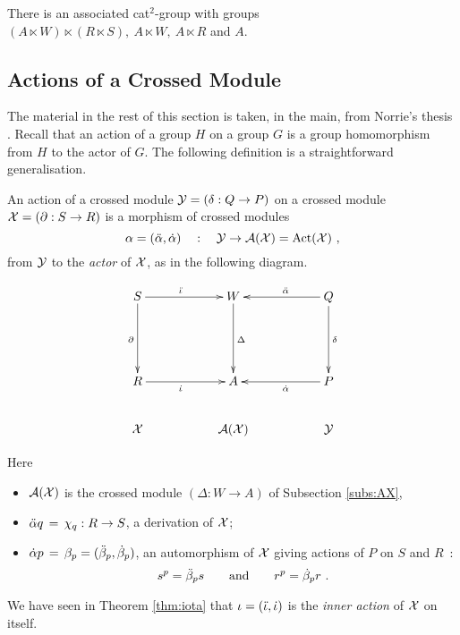 \noindent
There is an associated cat$^2$-group with groups 
$(A \ltimes W) \ltimes (R \ltimes S),~ A \ltimes W,~ A \ltimes R$ and $A$. 


\subsection{Actions of a Crossed Module}
\label{subs:xmod-action}

The material in the rest of this section is taken, in the main, 
from Norrie's thesis \cite{norrie-thesis}.
Recall that an action of a group $H$ on a group $G$
is a group homomorphism from $H$ to the actor of $G$.
The following definition is a straightforward generalisation.

\begin{defn} 
An action of a crossed module  $\mathcal{Y} = (\delta : Q \to P)$
on a crossed module  $\mathcal{X} = (\partial : S \to R)$ 
is a morphism of crossed modules
$$
\alpha = (\ddot{\alpha},\dot{\alpha}) \quad : \quad \mathcal{Y} \to \mathcal{A}(\mathcal{X}) = \mathrm{Act}(\mathcal{X})~,
$$
from $\mathcal{Y}$ to the \emph{actor} of $\mathcal{X}$, as in the following diagram.

\begin{equation} \label{eq:sq2}
\vcenter{\xymatrix{ 
  S \ar[rr]^(0.45){\ddi} \ar[dd]_{\partial}
     && W \ar[dd]^{\Delta}
     && Q \ar[ll]_(0.45){\dda} \ar[dd]^{\delta}  \\
     &&  &&  \\
  R \ar[rr]_(0.45){\di}
     && A
     && P \ar[ll]^(0.45){\da}  \\
  \calX
     && \calA(\calX)
         && \calY  \\
}}
\end{equation}
\end{defn}

\noindent
Here 
\begin{itemize}
\item
$\mathcal{A}(\mathcal{X})$  is the crossed module  $(\Delta : W \to A)$ 
of Subsection \ref{subs:AX},
\item
$\ddot{\alpha} q \,=\, \chi_q : R \to S$, a derivation of $\mathcal{X}$;
\item
$\dot{\alpha} p \,=\, \beta_p = (\ddot{\beta}_p,\dot{\beta}_p)$,
an automorphism of  $\mathcal{X}$  giving actions of  $P$  on  $S$  and  $R$~:
$$
s^p = \ddot{\beta}_p s
\quad \quad \mbox{and} \quad \quad  
r^p = \dot{\beta}_p r ~.
$$
\end{itemize}

\noindent
We have seen in Theorem \ref{thm:iota} that $\iota = (\ddot{\iota},\dot{\iota})$ 
is the \emph{inner action} of $\mathcal{X}$ on itself.

